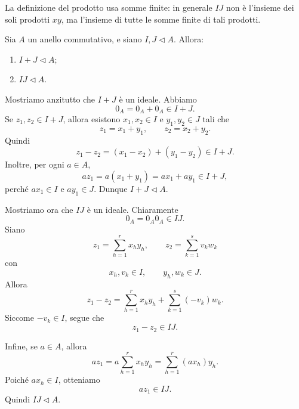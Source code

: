 \documentclass[a4paper]{article}
\begin{document}
\begin{radioactive}
La definizione del prodotto usa somme finite: in generale \(IJ\) non è l'insieme dei soli prodotti \(xy\), ma l'insieme di tutte le somme finite di tali prodotti.
\end{radioactive}

\begin{radioactive}
\begin{snippetproposition}{}
    Sia \(A\) un anello commutativo, e siano \(I,J\triangleleft A\).
    Allora:
    \begin{enumerate}
        \item \(I+J\triangleleft A\);
        \item \(IJ\triangleleft A\).
    \end{enumerate}
\end{snippetproposition}
\end{radioactive}

\begin{radioactive}
\begin{snippetproof}{}
    Mostriamo anzitutto che \(I+J\) è un ideale.
    Abbiamo
    \[
        0_A=0_A+0_A\in I+J.
    \]
    Se \(z_1,z_2\in I+J\), allora esistono \(x_1,x_2\in I\) e \(y_1,y_2\in J\) tali che
    \[
        z_1=x_1+y_1,
        \qquad
        z_2=x_2+y_2.
    \]
    Quindi
    \[
        z_1-z_2
        =
        (x_1-x_2)+(y_1-y_2)\in I+J.
    \]
    Inoltre, per ogni \(a\in A\),
    \[
        az_1
        =
        a(x_1+y_1)
        =
        ax_1+ay_1\in I+J,
    \]
    perché \(ax_1\in I\) e \(ay_1\in J\).
    Dunque \(I+J\triangleleft A\).

    Mostriamo ora che \(IJ\) è un ideale.
    Chiaramente
    \[
        0_A=0_A0_A\in IJ.
    \]
    Siano
    \[
        z_1=\sum_{h=1}^r x_hy_h,
        \qquad
        z_2=\sum_{k=1}^s v_kw_k
    \]
    con
    \[
        x_h,v_k\in I,
        \qquad
        y_h,w_k\in J.
    \]
    Allora
    \[
        z_1-z_2
        =
        \sum_{h=1}^r x_hy_h
        +
        \sum_{k=1}^s (-v_k)w_k.
    \]
    Siccome \(-v_k\in I\), segue che
    \[
        z_1-z_2\in IJ.
    \]

    Infine, se \(a\in A\), allora
    \[
        az_1
        =
        a\sum_{h=1}^r x_hy_h
        =
        \sum_{h=1}^r (ax_h)y_h.
    \]
    Poiché \(ax_h\in I\), otteniamo
    \[
        az_1\in IJ.
    \]
    Quindi \(IJ\triangleleft A\).
\end{snippetproof}
\end{radioactive}
\end{document}
